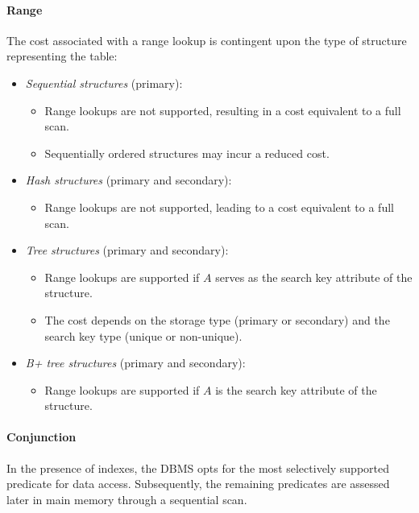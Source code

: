 \paragraph*{Range}
The cost associated with a range lookup is contingent upon the type of structure representing the table:
\begin{itemize}
    \item \textit{Sequential structures} (primary):
        \begin{itemize}
            \item Range lookups are not supported, resulting in a cost equivalent to a full scan.
            \item Sequentially ordered structures may incur a reduced cost.
        \end{itemize}
    \item \textit{Hash structures} (primary and secondary):
        \begin{itemize}
            \item Range lookups are not supported, leading to a cost equivalent to a full scan.
        \end{itemize}
    \item \textit{Tree structures} (primary and secondary):
        \begin{itemize}
            \item Range lookups are supported if $A$ serves as the search key attribute of the structure.
            \item The cost depends on the storage type (primary or secondary) and the search key type (unique or non-unique).
        \end{itemize}
    \item \textit{B+ tree structures} (primary and secondary):
        \begin{itemize}
            \item Range lookups are supported if $A$ is the search key attribute of the structure.
        \end{itemize}
\end{itemize}

\paragraph*{Conjunction}
In the presence of indexes, the DBMS opts for the most selectively supported predicate for data access. 
Subsequently, the remaining predicates are assessed later in main memory through a sequential scan.

